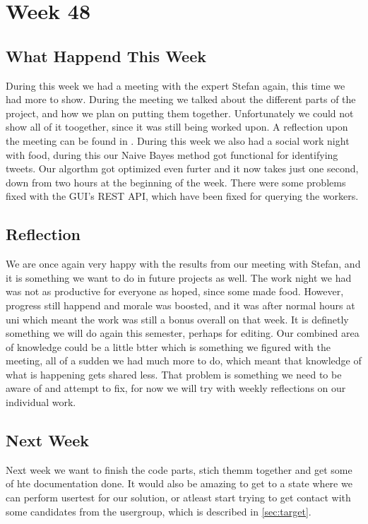 \section*{Week 48} 
\subsection*{What Happend This Week}
During this week we had a meeting with the expert Stefan again, this time we had
more to show. During the meeting we talked about the different parts of the
project, and how we plan on putting them together. Unfortunately we could not
show all of it toogether, since it was still being worked upon. A reflection
upon the meeting can be found in .
During this week we also had a social work night with food, during this our
Naive Bayes method got functional for identifying tweets. Our algorthm got
optimized even furter and it now takes just one second, down from two hours at
the beginning of the week. There were some problems fixed with the \ac{GUI}'s
\ac{REST} \ac{API}, which have been fixed for querying the workers.

\subsection*{Reflection}
We are once again very happy with the results from our meeting with Stefan, and
it is something we want to do in future projects as well. The work night we had
was not as productive for everyone as hoped, since some made food. However,
progress still happend and morale was boosted, and it was after normal hours at
uni which meant the work was still a bonus overall on that week. It is definetly
something we will do again this semester, perhaps for editing. Our combined area
of knowledge could be a little btter which is something we figured with the
meeting, all of a sudden we had much more to do, which meant that knowledge of
what is happening gets shared less. That problem is something we need to be
aware of and attempt to fix, for now we will try with weekly reflections
on our individual work. 

\subsection*{Next Week}
Next week we want to finish the code parts, stich themm together and get some of
hte documentation done. It would also be amazing to get to a state where we can
perform usertest for our solution, or atleast start trying to get contact with
some candidates from the usergroup, which is described in \autoref{sec:target}.



